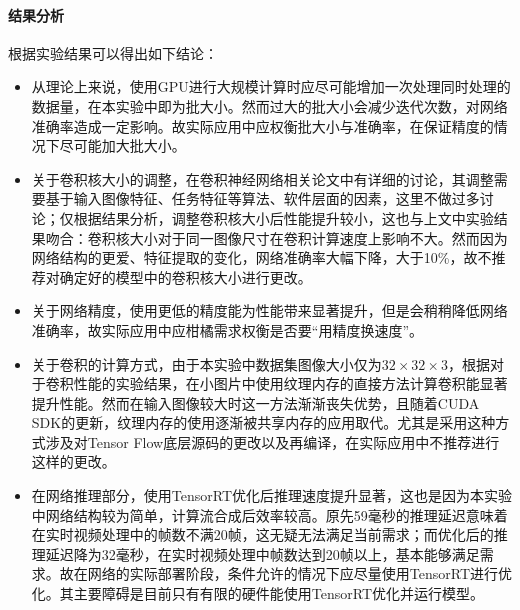 \paragraph{结果分析}
\par 根据实验结果可以得出如下结论：
\begin{itemize}
	\item 从理论上来说，使用GPU进行大规模计算时应尽可能增加一次处理同时处理的数据量，在本实验中即为批大小。然而过大的批大小会减少迭代次数，对网络准确率造成一定影响。故实际应用中应权衡批大小与准确率，在保证精度的情况下尽可能加大批大小。
	\item 关于卷积核大小的调整，在卷积神经网络相关论文中有详细的讨论，其调整需要基于输入图像特征、任务特征等算法、软件层面的因素，这里不做过多讨论；仅根据结果分析，调整卷积核大小后性能提升较小，这也与上文中实验结果吻合：卷积核大小对于同一图像尺寸在卷积计算速度上影响不大。然而因为网络结构的更爱、特征提取的变化，网络准确率大幅下降，大于10\%，故不推荐对确定好的模型中的卷积核大小进行更改。
	\item 关于网络精度，使用更低的精度能为性能带来显著提升，但是会稍稍降低网络准确率，故实际应用中应柑橘需求权衡是否要“用精度换速度”。
	\item 关于卷积的计算方式，由于本实验中数据集图像大小仅为$ 32\times 32\times 3 $，根据对于卷积性能的实验结果，在小图片中使用纹理内存的直接方法计算卷积能显著提升性能。然而在输入图像较大时这一方法渐渐丧失优势，且随着CUDA SDK的更新，纹理内存的使用逐渐被共享内存的应用取代。尤其是采用这种方式涉及对Tensor Flow底层源码的更改以及再编译，在实际应用中不推荐进行这样的更改。
	\item 在网络推理部分，使用TensorRT优化后推理速度提升显著，这也是因为本实验中网络结构较为简单，计算流合成后效率较高。原先59毫秒的推理延迟意味着在实时视频处理中的帧数不满20帧，这无疑无法满足当前需求；而优化后的推理延迟降为32毫秒，在实时视频处理中帧数达到20帧以上，基本能够满足需求。故在网络的实际部署阶段，条件允许的情况下应尽量使用TensorRT进行优化。其主要障碍是目前只有有限的硬件能使用TensorRT优化并运行模型。
\end{itemize}